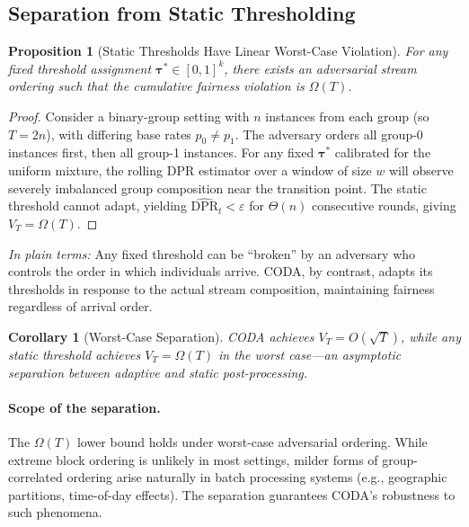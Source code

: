 \documentclass[letterpaper]{article} %
\newtheorem{proposition}[theorem]{Proposition}
\newtheorem{corollary}[theorem]{Corollary}
\theoremstyle{definition}
\begin{document}
\subsection{Separation from Static Thresholding}

\begin{proposition}[Static Thresholds Have Linear Worst-Case Violation]
\label{prop:static_lower}
For any fixed threshold assignment $\boldsymbol{\tau}^* \in [0,1]^k$, there exists an adversarial stream ordering such that the cumulative fairness violation is $\Omega(T)$.
\end{proposition}

\begin{proof}
Consider a binary-group setting with $n$ instances from each group (so $T = 2n$), with differing base rates $p_0 \neq p_1$. The adversary orders all group-0 instances first, then all group-1 instances. For any fixed $\boldsymbol{\tau}^*$ calibrated for the uniform mixture, the rolling DPR estimator over a window of size $w$ will observe severely imbalanced group composition near the transition point. The static threshold cannot adapt, yielding $\widehat{\text{DPR}}_t < \varepsilon$ for $\Theta(n)$ consecutive rounds, giving $V_T = \Omega(T)$.
\end{proof}

\emph{In plain terms:} Any fixed threshold can be ``broken'' by an adversary who controls the order in which individuals arrive. CODA, by contrast, adapts its thresholds in response to the actual stream composition, maintaining fairness regardless of arrival order.

\begin{corollary}[Worst-Case Separation]
\label{cor:separation}
CODA achieves $V_T = O(\sqrt{T})$, while any static threshold achieves $V_T = \Omega(T)$ in the worst case---an asymptotic separation between adaptive and static post-processing.
\end{corollary}

\paragraph{Scope of the separation.}
The $\Omega(T)$ lower bound holds under worst-case adversarial ordering. While extreme block ordering is unlikely in most settings, milder forms of group-correlated ordering arise naturally in batch processing systems (e.g., geographic partitions, time-of-day effects). The separation guarantees CODA's robustness to such phenomena.
\end{document}
